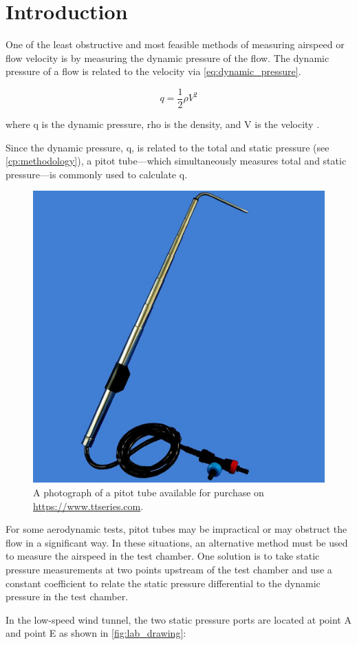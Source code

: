 \chapter{Introduction}
\label{cp:introduction}
One of the least obstructive and most feasible methods of measuring airspeed or flow velocity is by measuring the dynamic pressure of the flow. The dynamic pressure of a flow is related to the velocity via \autoref{eq:dynamic_pressure}.

\begin{equation} \label{eq:dynamic_pressure}
    q = \frac{1}{2} \rho V^2
\end{equation}

\noindent{}where \gls{q} is the dynamic pressure, \gls{rho} is the density, and \gls{V} is the velocity \citep{lab2-manual}.

Since the dynamic pressure, \gls{q}, is related to the total and static pressure (see \autoref{cp:methodology}), a pitot tube—which simultaneously measures total and static pressure—is commonly used to calculate \gls{q}.

\begin{figure}[htpb]
    \centering
    \includegraphics[width=0.5\linewidth]{Figures/pitot_tube.png}
    \caption[Photo of a pitot tube]{A photograph of a pitot tube available for purchase on \url{https://www.ttseries.com}.}
\end{figure}

For some aerodynamic tests, pitot tubes may be impractical or may obstruct the flow in a significant way. In these situations, an alternative method must be used to measure the airspeed in the test chamber. One solution is to take static pressure measurements at two points upstream of the test chamber and use a constant coefficient to relate the static pressure differential to the dynamic pressure in the test chamber.

In the low-speed wind tunnel, the two static pressure ports are located at point A and point E as shown in \autoref{fig:lab_drawing}:

